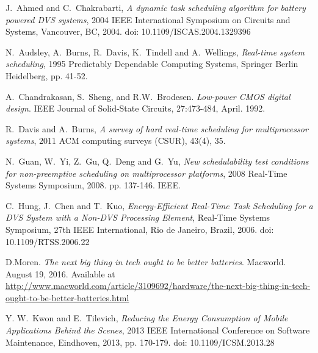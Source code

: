 \documentclass[10pt,article]{IEEEtran}
\begin{document}
%
%
%
\begin{thebibliography}{1}

J.~Ahmed and C.~Chakrabarti, \emph{A dynamic task scheduling algorithm for battery powered DVS systems}, 2004 IEEE International Symposium on Circuits and Systems, Vancouver, BC, 2004. doi: 10.1109/ISCAS.2004.1329396

N.~Audsley, A.~Burns, R.~Davis, K.~Tindell and A.~Wellings, \emph{Real-time system scheduling}, 1995 Predictably Dependable Computing Systems, Springer Berlin Heidelberg, pp. 41-52.

A.~Chandrakasan, S.~Sheng, and R.W.~Brodesen. \emph{Low-power CMOS digital design}. IEEE Journal of Solid-State Circuits, 27:473-484, April. 1992.

R.~Davis and A.~Burns, \emph{A survey of hard real-time scheduling for multiprocessor systems}, 2011 ACM computing surveys (CSUR), 43(4), 35.

N.~Guan, W.~Yi, Z.~Gu, Q.~Deng and G.~Yu, \emph{New schedulability test conditions for non-preemptive scheduling on multiprocessor platforms}, 2008 Real-Time Systems Symposium, 2008. pp. 137-146. IEEE.

C.~Hung, J.~Chen and T.~Kuo, \emph{Energy-Efficient Real-Time Task Scheduling for a DVS System with a Non-DVS Processing Element},  Real-Time Systems Symposium, 27th IEEE International, Rio de Janeiro, Brazil, 2006. doi: 10.1109/RTSS.2006.22

D.Moren. \emph{The next big thing in tech ought to be better batteries}. Macworld. August 19, 2016. Available at \url{http://www.macworld.com/article/3109692/hardware/the-next-big-thing-in-tech-ought-to-be-better-batteries.html}

Y. W.~Kwon and E.~Tilevich, \emph{Reducing the Energy Consumption of Mobile Applications Behind the Scenes}, 2013 IEEE International Conference on Software Maintenance, Eindhoven, 2013, pp. 170-179. doi: 10.1109/ICSM.2013.28


\end{thebibliography}
\end{document}
